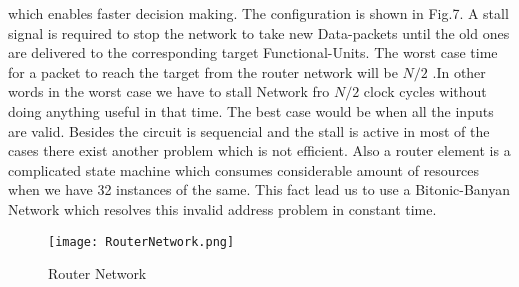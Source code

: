 					      which enables faster decision making. The configuration is shown in Fig.7. A stall signal is required
					      to stop the network to take new Data-packets until the old ones are delivered to the corresponding target Functional-Units. The worst case time for a packet to reach the target
					      from the router network will be $N / 2$ .In other words in the worst case we have to stall Network fro $N/2$ clock cycles without doing anything useful in that time. The best
					      case would be when all the inputs are valid. Besides the circuit is sequencial and the stall is active in most of the cases there exist another problem which is not efficient. 
					      Also a router element is a complicated state machine which consumes considerable amount of resources when we have 32 instances of the same. This fact 
					      lead us to use a Bitonic-Banyan Network which resolves this invalid address problem in constant time.
					      \begin{figure}[!ht]
							\texttt{[image: RouterNetwork.png]}
						      \caption{Router Network}
					      \end{figure}
